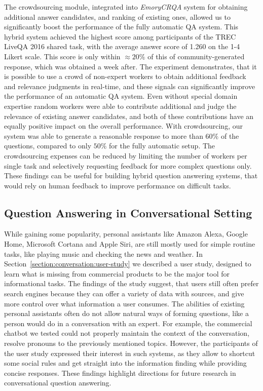 The crowdsourcing module, integrated into \textit{EmoryCRQA} system for obtaining additional answer candidates, and ranking of existing ones, allowed us to significantly boost the performance of the fully automatic QA system.
This hybrid system achieved the highest score among participants of the TREC LiveQA 2016 shared task, with the average answer score of 1.260 on the 1-4 Likert scale.
This score is only within $\approx 20\%$ of this of community-generated response, which was obtained a week after.
The experiment demonstrates, that it is possible to use a crowd of non-expert workers to obtain additional feedback and relevance judgments in real-time, and these signals can significantly improve the performance of an automatic QA system.
Even without special domain expertise random workers were able to contribute additional and judge the relevance of existing answer candidates, and both of these contributions have an equally positive impact on the overall performance.
With crowdsourcing, our system was able to generate a reasonable response to more than $60\%$ of the questions, compared to only $50\%$ for the fully automatic setup.
The crowdsourcing expenses can be reduced by limiting the number of workers per single task and selectively requesting feedback for more complex questions only.
These findings can be useful for building hybrid question answering systems, that would rely on human feedback to improve performance on difficult tasks.


\subsection{Question Answering in Conversational Setting}
\label{section:conclusion:summary:conversation}

While gaining some popularity, personal assistants like Amazon Alexa, Google Home, Microsoft Cortana and Apple Siri, are still mostly used for simple routine tasks, like playing music and checking the news and weather.
In Section~\ref{section:conversation:user-study} we described a user study, designed to learn what is missing from commercial products to be the major tool for informational tasks.
The findings of the study suggest, that users still often prefer search engines because they can offer a variety of data with sources, and give more control over what information a user consumes.
The abilities of existing personal assistants often do not allow natural ways of forming questions, like a person would do in a conversation with an expert.
For example, the commercial chatbot we tested could not properly maintain the context of the conversation, \eg resolve pronouns to the previously mentioned topics.
However, the participants of the user study expressed their interest in such systems, as they allow to shortcut some social rules and get straight into the information finding while providing concise responses.
These findings highlight directions for future research in conversational question answering.

